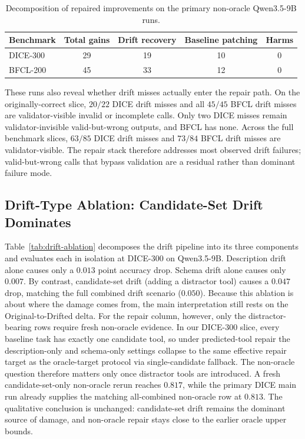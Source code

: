 \documentclass{svproc}
\begin{document}
\begin{table}[t]
\caption{Decomposition of repaired improvements on the primary non-oracle
Qwen3.5-9B runs.}
\label{tab:gain-decomposition}
\centering
\small
\begin{tabular}{lcccc}
\toprule
Benchmark & Total gains & Drift recovery & Baseline patching & Harms \\
\midrule
DICE-300 & 29 & 19 & 10 & 0 \\
BFCL-200 & 45 & 33 & 12 & 0 \\
\bottomrule
\end{tabular}
\end{table}

These runs also reveal whether drift misses actually enter the repair path.
On the originally-correct slice, $20/22$ DICE drift misses and all $45/45$ BFCL
drift misses are validator-visible invalid or incomplete calls. Only two DICE
misses remain validator-invisible valid-but-wrong outputs, and BFCL has none.
Across the full benchmark slices, $63/85$ DICE drift misses and $73/84$ BFCL
drift misses are validator-visible. The repair stack therefore addresses most
observed drift failures; valid-but-wrong calls that bypass validation are a
residual rather than dominant failure mode.

\subsection{Drift-Type Ablation: Candidate-Set Drift Dominates}
\label{sec:drift-ablation}
Table~\ref{tab:drift-ablation} decomposes the drift pipeline into its three
components and evaluates each in isolation at DICE-300 on Qwen3.5-9B. Description
drift alone causes only a $0.013$ point accuracy drop. Schema drift alone causes
only $0.007$. By contrast, candidate-set drift (adding a distractor tool) causes a
$0.047$ drop, matching the full combined drift scenario ($0.050$). Because this
ablation is about where the damage comes from, the main interpretation still rests
on the Original-to-Drifted delta. For the repair column, however, only the
distractor-bearing rows require fresh non-oracle evidence. In our DICE-300 slice,
every baseline task has exactly one candidate tool, so under predicted-tool repair
the description-only and schema-only settings collapse to the same effective repair
target as the oracle-target protocol via single-candidate fallback. The non-oracle
question therefore matters only once distractor tools are introduced. A fresh
candidate-set-only non-oracle rerun reaches $0.817$, while the primary DICE main
run already supplies the matching all-combined non-oracle row at $0.813$. The
qualitative conclusion is unchanged: candidate-set drift remains the dominant
source of damage, and non-oracle repair stays close to the earlier oracle upper
bounds.
\end{document}
